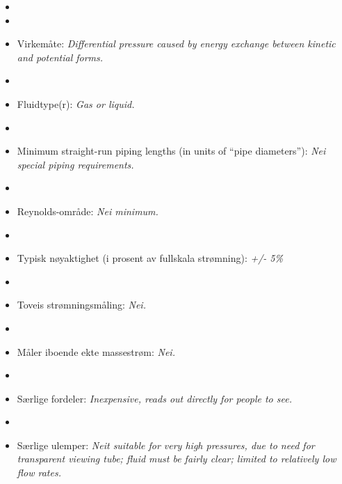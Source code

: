 \begin{itemize}
\goodbreak
\item{} 
\vskip 5pt
\item\item{} Virkemåte: {\it Differential pressure caused by energy exchange between kinetic and potential forms.}
\vskip 5pt
\item\item{} Fluidtype(r): {\it Gas or liquid.}
\vskip 5pt
\item\item{} Minimum straight-run piping lengths (in units of ``pipe diameters''): {\it Nei special piping requirements.}
\vskip 5pt
\item\item{} Reynolds-område: {\it Nei minimum.}
\vskip 5pt
\item\item{} Typisk nøyaktighet (i prosent av fullskala strømning): {\it +/- 5\%}
\vskip 5pt
\item\item{} Toveis strømningsmåling: {\it Nei.}
\vskip 5pt
\item\item{} Måler iboende ekte massestrøm: {\it Nei.}
\vskip 5pt
\item\item{} Særlige fordeler: {\it Inexpensive, reads out directly for people to see.}
\vskip 5pt
\item\item{} Særlige ulemper: {\it Neit suitable for very high pressures, due to need for transparent viewing tube; fluid must be fairly clear; limited to relatively low flow rates.}
\end{itemize}

